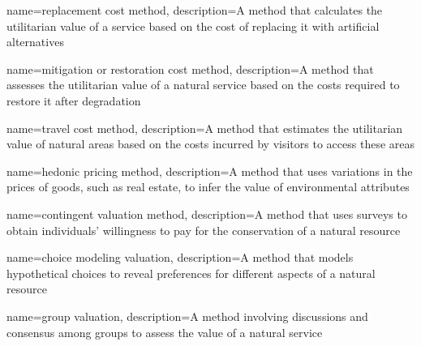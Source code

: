 {
	name=replacement cost method,
	description={A method that calculates the utilitarian value of a service based on the cost of replacing it with artificial alternatives}
}

{
	name=mitigation or restoration cost method,
	description={A method that assesses the utilitarian value of a natural service based on the costs required to restore it after degradation}
}

{
	name=travel cost method,
	description={A method that estimates the utilitarian value of natural areas based on the costs incurred by visitors to access these areas}
}

{
	name=hedonic pricing method,
	description={A method that uses variations in the prices of goods, such as real estate, to infer the value of environmental attributes}
}

{
	name=contingent valuation method,
	description={A method that uses surveys to obtain individuals' willingness to pay for the conservation of a natural resource}
}

{
	name=choice modeling valuation,
	description={A method that models hypothetical choices to reveal preferences for different aspects of a natural resource}
}

{
	name=group valuation,
	description={A method involving discussions and consensus among groups to assess the value of a natural service}
}
